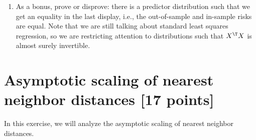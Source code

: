 \documentclass{article}
\begin{document}
\begin{enumerate}[label=(\alph*)]
\item As a bonus, prove or disprove: there is a predictor distribution such that
  we get an equality in the last display, i.e., the out-of-sample and in-sample
  risks are equal. Note that we are still talking about standard least squares
  regression, so we are restricting attention to distributions such that $X^\T
  X$ is almost surely invertible.  
\end{enumerate}

\section{Asymptotic scaling of nearest neighbor distances [17 points]} 

In this exercise, we will analyze the asymptotic scaling of nearest neighbor
distances.  
\end{document}
